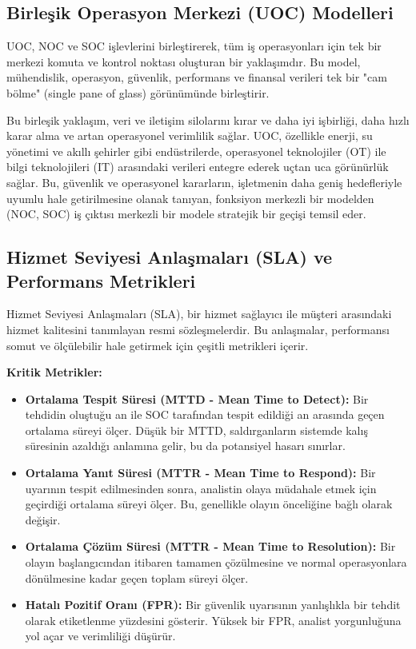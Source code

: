 \subsection{Birleşik Operasyon Merkezi (UOC) Modelleri}

UOC, NOC ve SOC işlevlerini birleştirerek, tüm iş operasyonları için tek bir merkezi komuta ve kontrol noktası oluşturan bir yaklaşımdır. Bu model, mühendislik, operasyon, güvenlik, performans ve finansal verileri tek bir "cam bölme" (single pane of glass) görünümünde birleştirir.

Bu birleşik yaklaşım, veri ve iletişim silolarını kırar ve daha iyi işbirliği, daha hızlı karar alma ve artan operasyonel verimlilik sağlar. UOC, özellikle enerji, su yönetimi ve akıllı şehirler gibi endüstrilerde, operasyonel teknolojiler (OT) ile bilgi teknolojileri (IT) arasındaki verileri entegre ederek uçtan uca görünürlük sağlar. Bu, güvenlik ve operasyonel kararların, işletmenin daha geniş hedefleriyle uyumlu hale getirilmesine olanak tanıyan, fonksiyon merkezli bir modelden (NOC, SOC) iş çıktısı merkezli bir modele stratejik bir geçişi temsil eder.

\subsection{Hizmet Seviyesi Anlaşmaları (SLA) ve Performans Metrikleri}

Hizmet Seviyesi Anlaşmaları (SLA), bir hizmet sağlayıcı ile müşteri arasındaki hizmet kalitesini tanımlayan resmi sözleşmelerdir. Bu anlaşmalar, performansı somut ve ölçülebilir hale getirmek için çeşitli metrikleri içerir.

\textbf{Kritik Metrikler:}

\begin{itemize}
    \item \textbf{Ortalama Tespit Süresi (MTTD - Mean Time to Detect):} Bir tehdidin oluştuğu an ile SOC tarafından tespit edildiği an arasında geçen ortalama süreyi ölçer. Düşük bir MTTD, saldırganların sistemde kalış süresinin azaldığı anlamına gelir, bu da potansiyel hasarı sınırlar.
    \item \textbf{Ortalama Yanıt Süresi (MTTR - Mean Time to Respond):} Bir uyarının tespit edilmesinden sonra, analistin olaya müdahale etmek için geçirdiği ortalama süreyi ölçer. Bu, genellikle olayın önceliğine bağlı olarak değişir.
    \item \textbf{Ortalama Çözüm Süresi (MTTR - Mean Time to Resolution):} Bir olayın başlangıcından itibaren tamamen çözülmesine ve normal operasyonlara dönülmesine kadar geçen toplam süreyi ölçer.
    \item \textbf{Hatalı Pozitif Oranı (FPR):} Bir güvenlik uyarısının yanlışlıkla bir tehdit olarak etiketlenme yüzdesini gösterir. Yüksek bir FPR, analist yorgunluğuna yol açar ve verimliliği düşürür.
\end{itemize}

